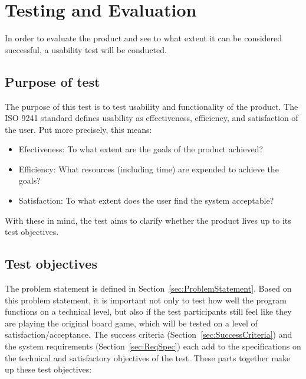 \chapter{Testing and Evaluation}\label{ch:testeval}
In order to evaluate the product and see to what extent it can be considered successful, a usability test will be conducted.

\section{Purpose of test}
The purpose of this test is to test usability and functionality of the product. The ISO 9241 \citep{ISO} standard defines usability as effectiveness, efficiency, and satisfaction of the user. Put more precisely, this means:
\begin{itemize}
\item Efectiveness: To what extent are the goals of the product achieved?
\item Efficiency: What resources (including time) are expended to achieve the goals?
\item Satisfaction: To what extent does the user find the system acceptable?
\end{itemize}
With these in mind, the test aims to clarify whether the product lives up to its test objectives.

\section{Test objectives}
The problem statement is defined in Section~\ref{sec:ProblemStatement}. Based on this problem statement, it is important not only to test how well the program functions on a technical level, but also if the test participants still feel like they are playing the original board game, which will be tested on a level of satisfaction/acceptance.
The success criteria (Section~\ref{sec:SuccessCriteria}) and the system requirements (Section~\ref{sec:ReqSpec}) each add to the specifications on the technical and satisfactory  objectives of the test.
These parts together make up these test objectives:


